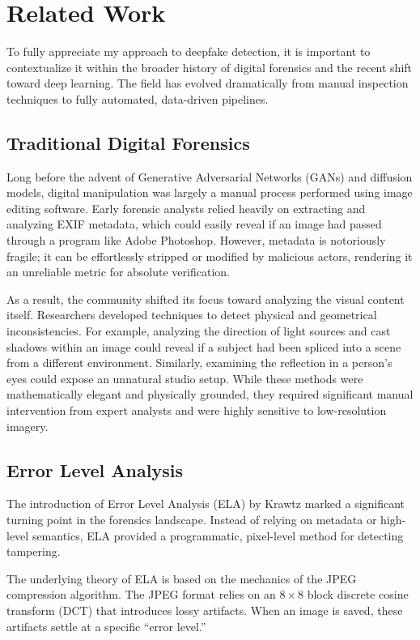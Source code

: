 \section{Related Work}
\label{sec:related}

To fully appreciate my approach to deepfake detection, it is important to contextualize it within the broader history of digital forensics and the recent shift toward deep learning. The field has evolved dramatically from manual inspection techniques to fully automated, data-driven pipelines.

\subsection{Traditional Digital Forensics}

Long before the advent of Generative Adversarial Networks (GANs) and diffusion models, digital manipulation was largely a manual process performed using image editing software. Early forensic analysts relied heavily on extracting and analyzing EXIF metadata, which could easily reveal if an image had passed through a program like Adobe Photoshop. However, metadata is notoriously fragile; it can be effortlessly stripped or modified by malicious actors, rendering it an unreliable metric for absolute verification.

As a result, the community shifted its focus toward analyzing the visual content itself. Researchers developed techniques to detect physical and geometrical inconsistencies. For example, analyzing the direction of light sources and cast shadows within an image could reveal if a subject had been spliced into a scene from a different environment. Similarly, examining the reflection in a person's eyes could expose an unnatural studio setup. While these methods were mathematically elegant and physically grounded, they required significant manual intervention from expert analysts and were highly sensitive to low-resolution imagery.

\subsection{Error Level Analysis}

The introduction of Error Level Analysis (ELA) by Krawtz \cite{ela2012} marked a significant turning point in the forensics landscape. Instead of relying on metadata or high-level semantics, ELA provided a programmatic, pixel-level method for detecting tampering.

The underlying theory of ELA is based on the mechanics of the JPEG compression algorithm. The JPEG format relies on an $8\times8$ block discrete cosine transform (DCT) that introduces lossy artifacts. When an image is saved, these artifacts settle at a specific ``error level.''

